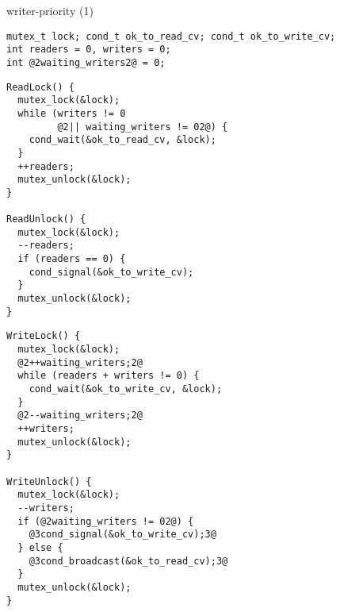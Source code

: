 
\begin{frame}[fragile,label=writerPriority]{writer-priority (1)}
\begin{lstlisting}
mutex_t lock; cond_t ok_to_read_cv; cond_t ok_to_write_cv;
int readers = 0, writers = 0;
int @2waiting_writers2@ = 0;
\end{lstlisting}
\vspace{-.3cm}
\begin{minipage}{0.45\textwidth}
\begin{lstlisting}
ReadLock() {
  mutex_lock(&lock);
  while (writers != 0
         @2|| waiting_writers != 02@) {
    cond_wait(&ok_to_read_cv, &lock);
  }
  ++readers;
  mutex_unlock(&lock);
}

ReadUnlock() {
  mutex_lock(&lock);
  --readers;
  if (readers == 0) {
    cond_signal(&ok_to_write_cv);
  }
  mutex_unlock(&lock);
}
\end{lstlisting}
\end{minipage}
\begin{minipage}{0.45\textwidth}
\begin{lstlisting}
WriteLock() {
  mutex_lock(&lock);
  @2++waiting_writers;2@
  while (readers + writers != 0) {
    cond_wait(&ok_to_write_cv, &lock);
  }
  @2--waiting_writers;2@
  ++writers;
  mutex_unlock(&lock);
}

WriteUnlock() {
  mutex_lock(&lock);
  --writers;
  if (@2waiting_writers != 02@) {
    @3cond_signal(&ok_to_write_cv);3@
  } else {
    @3cond_broadcast(&ok_to_read_cv);3@
  }
  mutex_unlock(&lock);
}
\end{lstlisting}
\end{minipage}
\end{frame}

